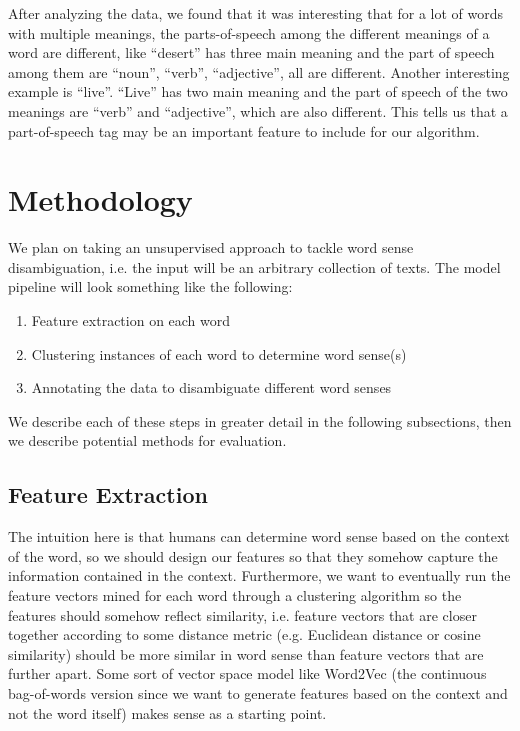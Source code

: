\documentclass[11pt,letterpaper]{article}
\begin{document}
After analyzing the data, we found that it was interesting that for a lot of words with multiple meanings, the parts-of-speech among the different meanings of a word are different, like ``desert'' has three main meaning and the part of speech among them are ``noun'', ``verb'', ``adjective'', all are different. Another interesting example is ``live''. ``Live'' has two main meaning and the part of speech of the two meanings are ``verb'' and ``adjective'', which are also different. This tells us that a part-of-speech tag may be an important feature to include for our algorithm.

\section{Methodology}
We plan on taking an unsupervised approach to tackle word sense disambiguation, i.e. the input will be an arbitrary collection of texts. The model pipeline will look something like the following:
\begin{enumerate}
  \item Feature extraction on each word
  \item Clustering instances of each word to determine word sense(s)
  \item Annotating the data to disambiguate different word senses
\end{enumerate}

We describe each of these steps in greater detail in the following subsections, then we describe potential methods for evaluation.

\subsection{Feature Extraction}
The intuition here is that humans can determine word sense based on the context of the word, so we should design our features so that they somehow capture the information contained in the context. Furthermore, we want to eventually run the feature vectors mined for each word through a clustering algorithm so the features should somehow reflect similarity, i.e. feature vectors that are closer together according to some distance metric (e.g. Euclidean distance or cosine similarity) should be more similar in word sense than feature vectors that are further apart. Some sort of vector space model like Word2Vec (the continuous bag-of-words version since we want to generate features based on the context and not the word itself) makes sense as a starting point. 
\end{document}
